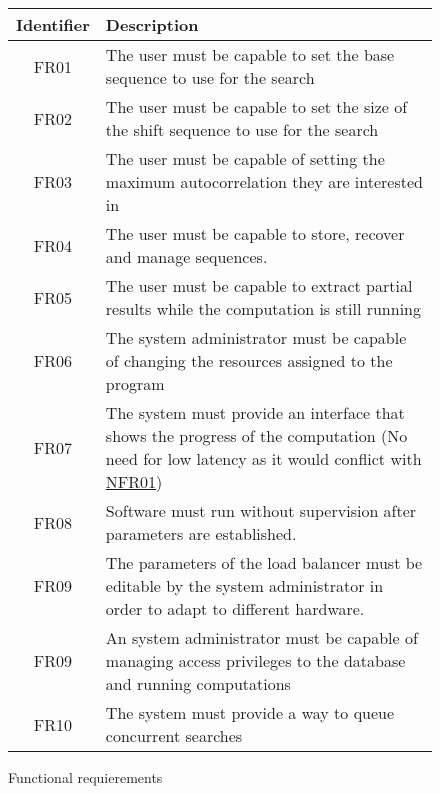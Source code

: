 \begin{figure}[ht!]
  \begin{center}
    \begin{tabular}{||c | p{12cm}||}
      \hline
      Identifier & Description \\
      \hline
      \hline
      FR01 \label{FR01} & The user must be capable to set the base
      sequence to use for the search \\
      \hline
      FR02 \label{FR02} & The user must be capable to set the size
      of the shift sequence to use for the search\\
      \hline
      FR03 \label{FR03} & The user must be capable of setting the maximum
      autocorrelation they are interested in \\
      \hline
       FR04 \label{FR04new} & The user must be capable to store, recover and
       manage sequences.\\
      \hline
      FR05 \label{FR04} & The user must be capable to extract partial
      results while the computation is still running \\
      \hline
      FR06 \label{FR05} & The system administrator must be capable of changing
      the resources assigned to the program\\
      \hline
      FR07 \label{FR06} & The system must provide an interface that shows
      the progress of the computation (No need for low latency
      as it would conflict with \hyperref[NFR01]{NFR01})\\
      \hline
      FR08 \label{FR07} & Software must
      run without supervision  after parameters are established. \\
      \hline
      FR09 \label{FR08} & The parameters of the load balancer must be editable
      by the system administrator in order to adapt to different hardware.
      \\
      \hline
      FR09 \label{FR09} & An system administrator must be capable of managing
      access privileges to the database and running computations\\
      \hline
      FR10 \label{FR10} & The system must provide a way to queue concurrent
      searches \\
      \hline
    \end{tabular}
  \end{center}

  \caption{Functional requierements}
  \label{functional:fig}
\end{figure}

